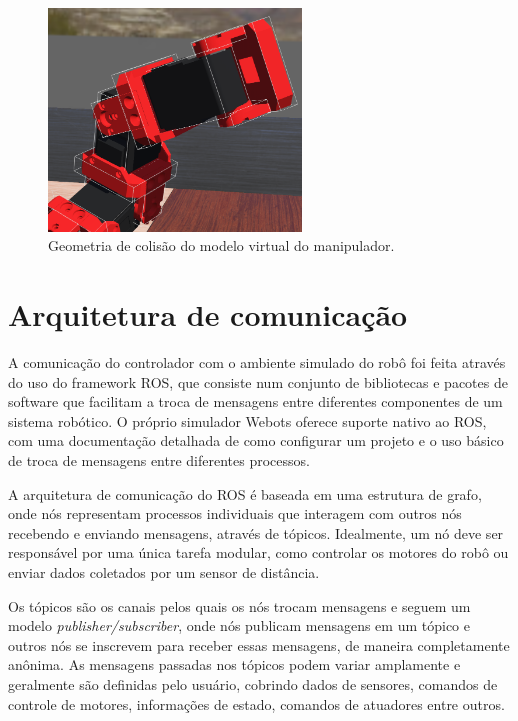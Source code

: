 \begin{figure}
    \centering
    \includegraphics[width=0.6\textwidth]{./Images/dynamic-model.png}
    \caption{Geometria de colisão do modelo virtual do manipulador.}\label{fig:dyn-chain}
\end{figure}

\section{Arquitetura de comunicação}

A comunicação do controlador com o ambiente simulado do robô foi feita através
do uso do framework ROS, que consiste num conjunto de bibliotecas e pacotes de
software que facilitam a troca de mensagens entre diferentes componentes de um
sistema robótico. O próprio simulador Webots oferece suporte nativo ao ROS, com
uma documentação detalhada de como configurar um projeto e o uso básico de
troca de mensagens entre diferentes processos.

A arquitetura de comunicação do ROS é baseada em uma estrutura de grafo, onde
nós representam processos individuais que interagem com outros nós recebendo e
enviando mensagens, através de tópicos. Idealmente, um nó deve ser responsável
por uma única tarefa modular, como controlar os motores do robô ou enviar dados
coletados por um sensor de distância.

Os tópicos são os canais pelos quais os nós trocam mensagens e seguem um modelo
\emph{publisher/subscriber}, onde nós publicam mensagens em um tópico e outros
nós se inscrevem para receber essas mensagens, de maneira completamente
anônima. As mensagens passadas nos tópicos podem variar amplamente e geralmente
são definidas pelo usuário, cobrindo dados de sensores, comandos de controle de
motores, informações de estado, comandos de atuadores entre outros.


